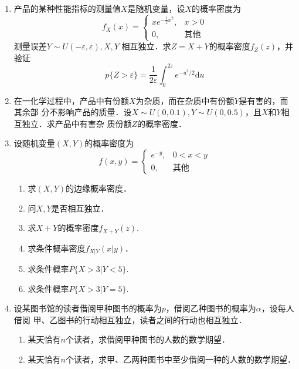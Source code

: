 \documentclass[10pt,a4paper]{article}
\begin{document}
\begin{enumerate}
    \item 产品的某种性能指标的测量值$X$是随机变量，设$X$的概率密度为
    $$f_X(x)=\left\{\begin{array}{ll}
        xe^{-\frac{1}{2}x^2}, & x>0\\
        0, & \mbox{其他}
    \end{array}\right.$$
    测量误差$Y\sim U(-\varepsilon ,\varepsilon),X,Y$ 相互独立．求$Z=X+Y$的概率密度$f_Z(z)$，并验证
    $$p\{Z>\varepsilon\}=\frac{1}{2\varepsilon}\int_0^{2\varepsilon} e^{-u^2/2}\mathrm{d}u$$
    \clearpage



    \item 在一化学过程中，产品中有份额$X$为杂质，而在杂质中有份额$Y$是有害的，而其余部
    分不影响产品的质量．设$X\sim U(0,0.1),Y\sim U(0,0.5)$，且$X$和$Y$相互独立．求产品中有害杂
    质份额$Z$的概率密度．
    \clearpage



    \item 设随机变量$(X,Y)$的概率密度为
    $$f(x,y)=\left\{\begin{array}{ll}
        e^{-y}, & 0<x<y\\
        0, & \mbox{其他}
    \end{array}\right.$$
    \begin{enumerate}
        \item 求$(X,Y)$的边缘概率密度．
        \item 问$X,Y$是否相互独立．
        \item 求$X+Y$的概率密度$f_{X+Y}(z)$.
        \item 求条件概率密度$f_{X|Y}(x|y)$．
        \item 求条件概率$P\{X>3|Y<5\}$.
        \item 求条件概率$P\{X>3|Y=5\}$.
    \end{enumerate}
    \clearpage


    \item 设某图书馆的读者借阅甲种图书的概率为$p$，借阅乙种图书的概率为$\alpha$，设每人借阅
    甲、乙图书的行动相互独立，读者之间的行动也相互独立．
    \begin{enumerate}
        \item 某天恰有$n$个读者，求借阅甲种图书的人数的数学期望．
        \item 某天恰有$n$个读者，求甲、乙两种图书中至少借阅一种的人数的数学期望．
    \end{enumerate}
    \clearpage




\end{enumerate}
\end{document}
